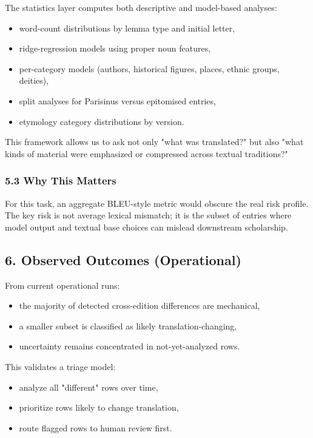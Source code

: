 \documentclass[
]{article}
\providecommand{\tightlist}{%
  \setlength{\itemsep}{0pt}\setlength{\parskip}{0pt}}
\begin{document}
The statistics layer computes both descriptive and model-based analyses:

\begin{itemize}
\tightlist
\item
  word-count distributions by lemma type and initial letter,
\item
  ridge-regression models using proper noun features,
\item
  per-category models (authors, historical figures, places, ethnic
  groups, deities),
\item
  split analyses for Parisinus versus epitomised entries,
\item
  etymology category distributions by version.
\end{itemize}

This framework allows us to ask not only "what was translated?" but also
"what kinds of material were emphasized or compressed across textual
traditions?"

\hypertarget{53-why-this-matters}{%
\subsubsection{5.3 Why This Matters}\label{53-why-this-matters}}

For this task, an aggregate BLEU-style metric would obscure the real
risk profile. The key risk is not average lexical mismatch; it is the
subset of entries where model output and textual base choices can
mislead downstream scholarship.

\hypertarget{6-observed-outcomes-operational}{%
\subsection{6. Observed Outcomes
(Operational)}\label{6-observed-outcomes-operational}}

From current operational runs:

\begin{itemize}
\tightlist
\item
  the majority of detected cross-edition differences are mechanical,
\item
  a smaller subset is classified as likely translation-changing,
\item
  uncertainty remains concentrated in not-yet-analyzed rows.
\end{itemize}

This validates a triage model:

\begin{itemize}
\tightlist
\item
  analyze all "different" rows over time,
\item
  prioritize rows likely to change translation,
\item
  route flagged rows to human review first.
\end{itemize}
\end{document}
